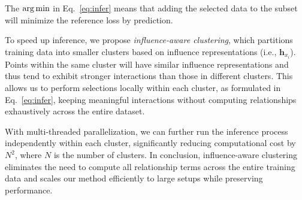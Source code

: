 The $\operatorname*{arg\,min}$ in Eq.~\ref{eq:infer} means that adding the selected data to the subset will minimize the reference loss by prediction. 


To speed up inference, we propose \textit{influence-aware clustering}, which partitions training data into smaller clusters based on influence representations (i.e., $\textbf{h}_{x_i}$). Points within the same cluster will have similar influence representations and thus tend to exhibit stronger interactions than those in different clusters. This allows us to perform selections locally within each cluster, as formulated in Eq.~\ref{eq:infer}, keeping meaningful interactions without computing relationships exhaustively across the entire dataset.


With multi-threaded parallelization, we can further run the inference process independently within each cluster, significantly reducing computational cost by $N^2$, where $N$ is the number of clusters. In conclusion, influence-aware clustering eliminates the need to compute all relationship terms across the entire training data and scales our method efficiently to large setups while preserving performance.




